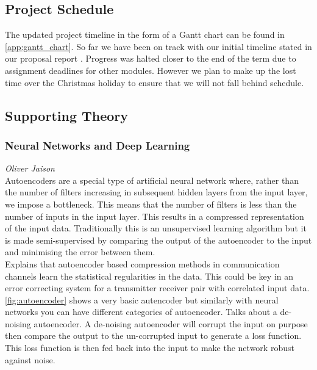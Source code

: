 \subsection{Project Schedule}

The updated project timeline in the form of a Gantt chart can be found in \autoref{app:gantt_chart}. So far we have been on track with our initial timeline stated in our proposal report \autocite{proposal_report}. Progress was halted closer to the end of the term due to assignment deadlines for other modules. However we plan to make up the lost time over the Christmas holiday to ensure that we will not fall behind schedule.

\subsection{Supporting Theory}

    \subsubsection{Neural Networks and Deep Learning}
        \hspace*{0pt}\hfill \textit{Oliver Jaison}\\
        
        Autoencoders are a special type of artificial neural network where, rather than the number of filters increasing in subsequent hidden layers from the input layer, we impose a bottleneck. This means that the number of filters is less than the number of inputs in the input layer. This results in a compressed representation of the input data. Traditionally this is an unsupervised learning algorithm but it is made semi-supervised by comparing the output of the autoencoder to the input and minimising the error between them.
        \\
        
        \autocite{8820761} Explains that autoencoder based compression methods in communication channels learn the statistical regularities in the data. This could be key in an error correcting system for a transmitter receiver pair with correlated input data.
        \\
        
        \autoref{fig:autoencoder} shows a very basic autencoder but similarly with neural networks you can have different categories of autoencoder. \autocite{9058605} Talks about a de-noising autoencoder. A de-noising autoencoder will corrupt the input on purpose then compare the output to the un-corrupted input to generate a loss function. This loss function is then fed back into the input to make the network robust against noise.
        \\
        
